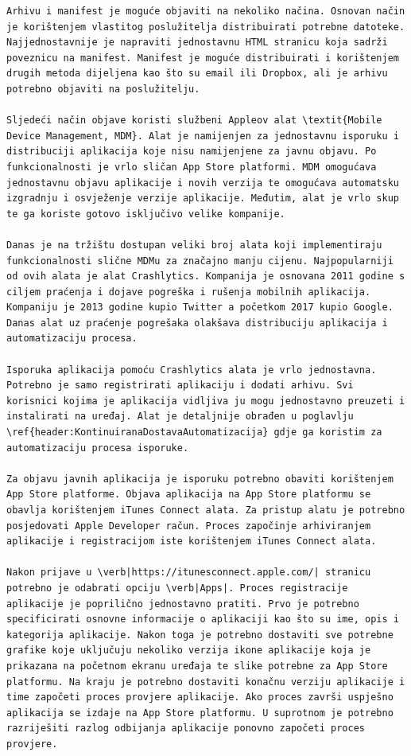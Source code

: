 \documentclass[times, utf8, diplomski, numeric]{fer}
\begin{document}
\begin{appendices}
\begin{lstlisting}[caption=Provjera postojanja i pokretanje Swiftlint alata, label=listing:swiftlint]
Arhivu i manifest je moguće objaviti na nekoliko načina. Osnovan način je korištenjem vlastitog poslužitelja distribuirati potrebne datoteke. Najjednostavnije je napraviti jednostavnu HTML stranicu koja sadrži poveznicu na manifest. Manifest je moguće distribuirati i korištenjem drugih metoda dijeljena kao što su email ili Dropbox, ali je arhivu potrebno objaviti na poslužitelju.

Sljedeći način objave koristi službeni Appleov alat \textit{Mobile Device Management, MDM}. Alat je namijenjen za jednostavnu isporuku i distribuciji aplikacija koje nisu namijenjene za javnu objavu. Po funkcionalnosti je vrlo sličan App Store platformi. MDM omogućava jednostavnu objavu aplikacije i novih verzija te omogućava automatsku izgradnju i osvježenje verzije aplikacije. Međutim, alat je vrlo skup te ga koriste gotovo isključivo velike kompanije.

Danas je na tržištu dostupan veliki broj alata koji implementiraju funkcionalnosti slične MDMu za značajno manju cijenu. Najpopularniji od ovih alata je alat Crashlytics. Kompanija je osnovana 2011 godine s ciljem praćenja i dojave pogreška i rušenja mobilnih aplikacija. Kompaniju je 2013 godine kupio Twitter a početkom 2017 kupio Google. Danas alat uz praćenje pogrešaka olakšava distribuciju aplikacija i automatizaciju procesa.

Isporuka aplikacija pomoću Crashlytics alata je vrlo jednostavna. Potrebno je samo registrirati aplikaciju i dodati arhivu. Svi korisnici kojima je aplikacija vidljiva ju mogu jednostavno preuzeti i instalirati na uređaj. Alat je detaljnije obrađen u poglavlju \ref{header:KontinuiranaDostavaAutomatizacija} gdje ga koristim za automatizaciju procesa isporuke.

Za objavu javnih aplikacija je isporuku potrebno obaviti korištenjem App Store platforme. Objava aplikacija na App Store platformu se obavlja korištenjem iTunes Connect alata. Za pristup alatu je potrebno posjedovati Apple Developer račun. Proces započinje arhiviranjem aplikacije i registracijom iste korištenjem iTunes Connect alata.

Nakon prijave u \verb|https://itunesconnect.apple.com/| stranicu potrebno je odabrati opciju \verb|Apps|. Proces registracije aplikacije je poprilično jednostavno pratiti. Prvo je potrebno specificirati osnovne informacije o aplikaciji kao što su ime, opis i kategorija aplikacije. Nakon toga je potrebno dostaviti sve potrebne grafike koje uključuju nekoliko verzija ikone aplikacije koja je prikazana na početnom ekranu uređaja te slike potrebne za App Store platformu. Na kraju je potrebno dostaviti konačnu verziju aplikacije i time započeti proces provjere aplikacije. Ako proces završi uspješno aplikacija se izdaje na App Store platformu. U suprotnom je potrebno razriješiti razlog odbijanja aplikacije ponovno započeti proces provjere.




\end{lstlisting}
\end{appendices}
\end{document}
